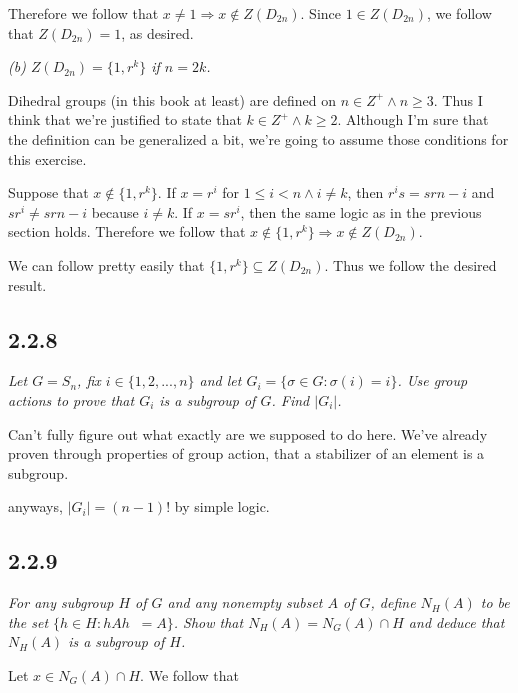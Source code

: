 \documentclass[11pt,oneside,titlepage]{book}
\DeclareMathOperator \inv {^{-1}}
\DeclareMathOperator \ra {\Rightarrow}
\newcommand{\set}[1]{\{ #1 \}}
\begin{document}
Therefore we follow that $x \neq 1 \ra x \notin Z(D_{2n})$. Since $1 \in Z(D_{2n})$,
we follow that $Z(D_{2n}) = 1$, as desired.

\textit{(b) $Z(D_{2n}) = \set{1, r^k}$ if $n = 2k$.}

Dihedral groups (in this book at least) are defined on $n \in Z^+ \land n \geq 3$. Thus
I think that we're justified to state that $k \in Z^+ \land k \geq 2$. Although I'm sure that
the definition can be generalized a bit, we're going to assume those conditions for this
exercise.

Suppose that $x \notin \set{1, r^k}$. If $x = r^i$ for $1 \leq i < n \land i \neq k$, then
$r^i s = s r{n - i} $ and $s r^i \neq s r{n - i}$ because $i \neq k$.
If $x = sr^i$, then the same logic as in the previous section holds. Therefore we follow that
$x \notin \set{1, r^k} \ra x \notin Z(D_{2n})$.

We can follow pretty easily that $\set{1, r^k} \subseteq Z(D_{2n})$. Thus we follow the desired
result.

\subsection*{2.2.8}

\textit{Let $G = S_n$, fix $i \in \set{1, 2, ..., n}$ and let
  $G_i = \set{\sigma \in G: \sigma(i) = i}$. Use group actions to prove that $G_i$ is a subgroup
  of $G$. Find $|G_i|$.}

Can't fully figure out what exactly are we supposed to do here. We've already proven through
properties of group action, that a stabilizer of an element is a subgroup.

anyways, $|G_i| = (n - 1)!$ by simple logic.

\subsection*{2.2.9}

\textit{For any subgroup $H$ of $G$ and any nonempty subset $A$ of $G$, define $N_H(A)$ to
  be  the set $\set{h \in H: h A h\inv = A}$. Show that $N_H(A) = N_G(A) \cap H$ and deduce that
  $N_H(A)$ is a subgroup of $H$.}

Let $x \in N_G(A) \cap H$. We follow that 
\end{document}
